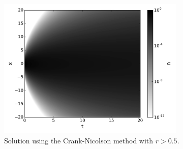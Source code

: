 \documentclass[12pt]{article}
\begin{document}
\begin{figure}[ht]
    \centering
    \includegraphics[width=0.8\textwidth]{crankNicolson-r0.665}
    \caption{Solution using the Crank-Nicolson method with $r > 0.5$.}
    \label{fig:crankNicolson-r0.665}
\end{figure}
\end{document}
